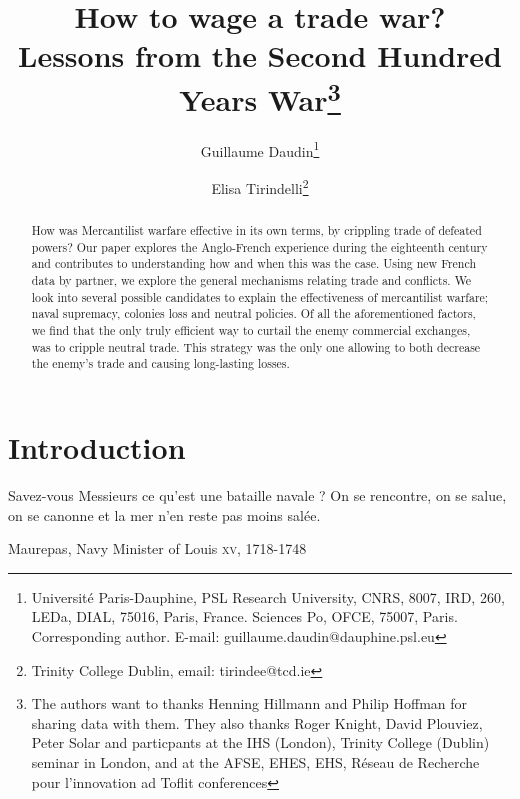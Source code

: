 \documentclass[12pt,a4paper,notitlepage,english]{article}
\author{
  Guillaume Daudin\thanks{Université Paris-Dauphine, PSL Research University, CNRS, 8007, IRD, 260, LEDa, DIAL, 75016, Paris, France. Sciences Po, OFCE, 75007, Paris. Corresponding author. E-mail: guillaume.daudin@dauphine.psl.eu}
  \and
  Elisa Tirindelli\thanks{Trinity College Dublin, email: tirindee@tcd.ie}
}
\title{How to wage a trade war? \\ Lessons from the Second Hundred Years War\thanks{The authors want to thanks Henning Hillmann and Philip Hoffman for sharing data with them. They also thanks Roger Knight, David Plouviez, Peter Solar and particpants at the IHS (London), Trinity College (Dublin) seminar in London, and at the AFSE, EHES, EHS, Réseau de Recherche pour l’innovation ad Toflit conferences}}
\date{}
\begin{document}
\maketitle


\begin{abstract}
How was Mercantilist warfare effective in its own terms, by crippling trade of defeated powers? Our paper explores the Anglo-French experience during the eighteenth century and contributes to understanding how and when this was the case. Using new French data by partner, we explore the general mechanisms relating trade and conflicts. We look into several possible candidates to explain the effectiveness of mercantilist warfare; naval supremacy, colonies loss and neutral policies. Of all the aforementioned factors, we find that the only truly efficient way to curtail the enemy commercial exchanges, was to cripple neutral trade. This strategy was the only one allowing to both decrease the enemy's trade and causing long-lasting losses.
\end{abstract}


\section{Introduction} \label{introduction}

\epigraph{Savez-vous Messieurs ce qu’est une bataille navale ? On se rencontre, on se salue, on se canonne et la mer n’en reste pas moins salée.}{Maurepas, Navy Minister of Louis  \textsc{xv}, 1718-1748}

\maketitle
\end{document}
